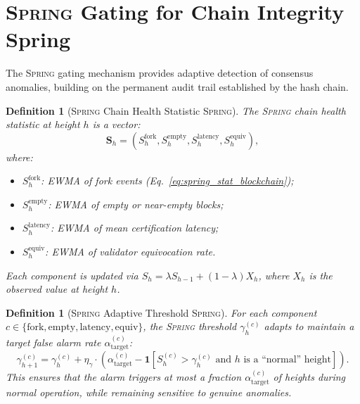 \documentclass[11pt,a4paper]{article}
\newtheorem{definition}[theorem]{Definition}
\theoremstyle{definition}
\newcommand{\Spring}{\textsc{Spring}}
\newcommand{\ind}[1]{\mathbf{1}[#1]}
\begin{document}
\section{\Spring{} Gating for Chain Integrity Spring}
\label{sec:spring}
The \Spring{} gating mechanism provides adaptive detection of consensus anomalies, building on the permanent audit trail established by the hash chain.
\begin{definition}[\Spring{} Chain Health Statistic \Spring{}]
\label{def:spring_chain_health}
The \Spring{} chain health statistic at height $h$ is a vector:
\begin{equation}
    \mathbf{S}_h = (S_h^{\mathrm{fork}}, S_h^{\mathrm{empty}}, S_h^{\mathrm{latency}}, S_h^{\mathrm{equiv}}),
    \label{eq:spring_health}
\end{equation}
where:
\begin{itemize}
    \item $S_h^{\mathrm{fork}}$: EWMA of fork events (Eq.~\ref{eq:spring_stat_blockchain});
    \item $S_h^{\mathrm{empty}}$: EWMA of empty or near-empty blocks;
    \item $S_h^{\mathrm{latency}}$: EWMA of mean certification latency;
    \item $S_h^{\mathrm{equiv}}$: EWMA of validator equivocation rate.
\end{itemize}
Each component is updated via $S_h = \lambda S_{h-1} + (1-\lambda) X_h$, where $X_h$ is the observed value at height $h$.
\end{definition}
\begin{definition}[\Spring{} Adaptive Threshold \Spring{}]
\label{def:spring_adaptive_threshold}
For each component $c \in \{\mathrm{fork}, \mathrm{empty}, \mathrm{latency}, \mathrm{equiv}\}$, the \Spring{} threshold $\gamma_h^{(c)}$ adapts to maintain a target false alarm rate $\alpha_{\mathrm{target}}^{(c)}$:
\begin{equation}
    \gamma_{h+1}^{(c)} = \gamma_h^{(c)} + \eta_\gamma \cdot \left(\alpha_{\mathrm{target}}^{(c)} - \ind{S_h^{(c)} > \gamma_h^{(c)} \text{ and } h \text{ is a ``normal'' height}}\right).
    \label{eq:spring_adaptive_threshold}
\end{equation}
This ensures that the alarm triggers at most a fraction $\alpha_{\mathrm{target}}^{(c)}$ of heights during normal operation, while remaining sensitive to genuine anomalies.
\end{definition}
\end{document}
